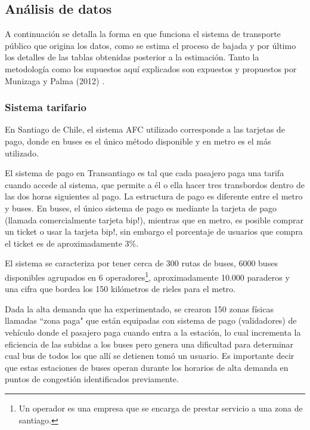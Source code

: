 \documentclass[12pt]{article}
\begin{document}
    \subsection{Análisis de datos}\label{sec:Analisis_datos}

	A continuación se detalla la forma en que funciona el sistema de transporte público que origina los datos, como se estima el proceso de bajada y por último los detalles de las tablas obtenidas posterior a la estimación. Tanto la metodología como los supuestos aquí explicados son expuestos y propuestos por Munizaga y Palma (2012) \cite{Procesamiento_datos}.
	
	\subsubsection{Sistema tarifario}
En Santiago de Chile, el sistema AFC utilizado corresponde a las tarjetas de pago, donde en buses es el único método disponible y en metro es el más utilizado.

El sistema de pago en Transantiago es tal que cada pasajero paga una tarifa cuando accede al sistema, que permite a él o ella hacer tres transbordos dentro de las dos horas siguientes al pago. La estructura de pago es diferente entre el metro y buses. En buses, el único sistema de pago es mediante la tarjeta de pago (llamada comercialmente tarjeta bip!), mientras que en metro, es posible comprar un ticket o usar la tarjeta bip!, sin embargo el porcentaje de usuarios que compra el ticket es de aproximadamente 3\%.


El sistema se caracteriza por tener cerca de 300 rutas de buses, 6000 buses disponibles agrupados en 6 operadores\footnote{Un operador es una empresa que se encarga de prestar servicio a una zona de santiago.}, aproximadamente 10.000 paraderos y una cifra que bordea los 150 kilómetros de rieles para el metro. 

Dada la alta demanda que ha experimentado, se crearon 150 zonas físicas llamadas ``zona paga" que están equipadas con sistema de pago (validadores) de vehículo donde el pasajero paga cuando entra a la estación, lo cual incrementa la eficiencia de las subidas a los buses pero genera una dificultad para determinar cual bus de todos los que allí se detienen tomó un usuario. Es importante decir que estas estaciones de buses operan durante los horarios de alta demanda en puntos de congestión identificados previamente.
\end{document}
